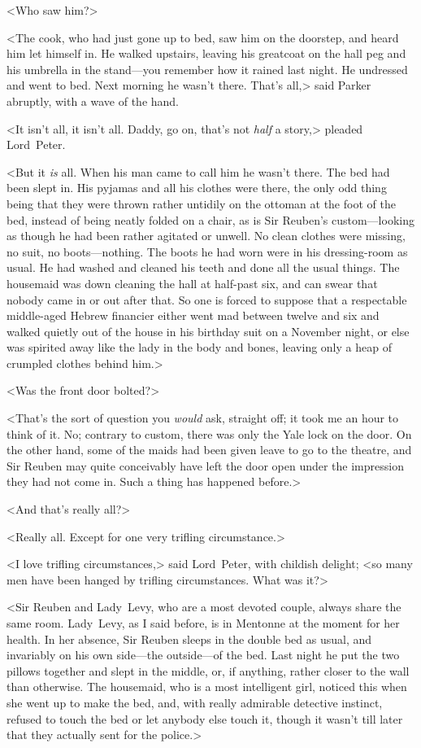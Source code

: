 <Who saw him?>

<The cook, who had just gone up to bed, saw him on the doorstep, and heard him let himself in. He walked upstairs, leaving his greatcoat on the hall peg and his umbrella in the stand—you remember how it rained last night. He undressed and went to bed. Next morning he wasn't there. That's all,> said Parker abruptly, with a wave of the hand.

<It isn't all, it isn't all. Daddy, go on, that's not \emph{half} a story,> pleaded Lord~Peter.

<But it \emph{is} all. When his man came to call him he wasn't there. The bed had been slept in. His pyjamas and all his clothes were there, the only odd thing being that they were thrown rather untidily on the ottoman at the foot of the bed, instead of being neatly folded on a chair, as is Sir Reuben's custom—looking as though he had been rather agitated or unwell. No clean clothes were missing, no suit, no boots—nothing. The boots he had worn were in his dressing-room as usual. He had washed and cleaned his teeth and done all the usual things. The housemaid was down cleaning the hall at half-past six, and can swear that nobody came in or out after that. So one is forced to suppose that a respectable middle-aged Hebrew financier either went mad between twelve and six  and walked quietly out of the house in his birthday suit on a November night, or else was spirited away like the lady in the  body and bones, leaving only a heap of crumpled clothes behind him.>

<Was the front door bolted?>

<That's the sort of question you \emph{would} ask, straight off; it took me an hour to think of it. No; contrary to custom, there was only the Yale lock on the door. On the other hand, some of the maids had been given leave to go to the theatre, and Sir Reuben may quite conceivably have left the door open under the impression they had not come in. Such a thing has happened before.>

<And that's really all?>

<Really all. Except for one very trifling circumstance.>

<I love trifling circumstances,> said Lord~Peter, with childish delight; <so many men have been hanged by trifling circumstances. What was it?>

<Sir Reuben and Lady~Levy, who are a most devoted couple, always share the same room. Lady~Levy, as I said before, is in Mentonne at the moment for her health. In her absence, Sir Reuben sleeps in the double bed as usual, and invariably on his own side—the outside—of the bed. Last night he put the two pillows together and slept in the middle, or, if anything, rather closer to the wall than otherwise. The housemaid, who is a most intelligent girl, noticed this when she went up to make the bed, and, with really admirable detective instinct, refused to touch the bed or let anybody else touch it, though it wasn't till later that they actually sent for the police.>

